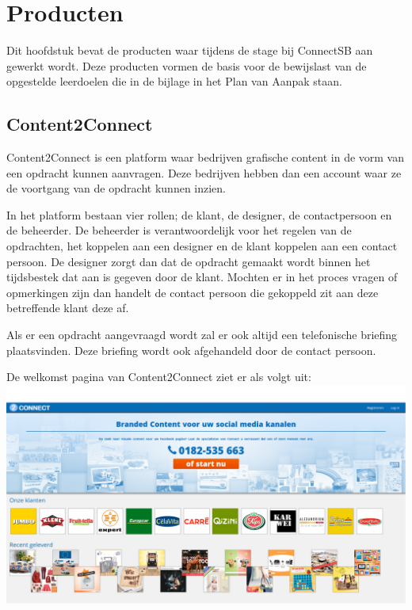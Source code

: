 \section{Producten}
Dit hoofdstuk bevat de producten waar tijdens de stage bij ConnectSB aan gewerkt wordt. Deze producten vormen de basis voor de bewijslast van de opgestelde leerdoelen die in de bijlage in het Plan van Aanpak staan.

\subsection{Content2Connect}
Content2Connect is een platform waar bedrijven grafische content in de vorm van een opdracht kunnen aanvragen. Deze bedrijven hebben dan een account waar ze de voortgang van de opdracht kunnen inzien.

In het platform bestaan vier rollen; de klant, de designer, de contactpersoon en de beheerder. De beheerder is verantwoordelijk voor het regelen van de opdrachten, het koppelen aan een designer en de klant koppelen aan een contact persoon. De designer zorgt dan dat de opdracht gemaakt wordt binnen het tijdsbestek dat aan is gegeven door de klant. Mochten er in het proces vragen of opmerkingen zijn dan handelt de contact persoon die gekoppeld zit aan deze betreffende klant deze af.

Als er een opdracht aangevraagd wordt zal er ook altijd een telefonische briefing plaatsvinden. Deze briefing wordt ook afgehandeld door de contact persoon.

De welkomst pagina van Content2Connect ziet er als volgt uit:
\includegraphics{content2connect}

\clearpage